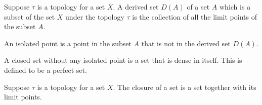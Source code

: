 \begin{definition}
	\label{definition-perfect}
	Suppose $\tau$ is a topology for a set $X$.
	A derived set $D(A)$ of a set $A$ which is a subset of the set $X$ under the topology $\tau$ is the collection of all the limit points of the subset $A$.

	An isolated point is a point in the subset $A$ that is not in the derived set $D(A)$.

	A closed set without any isolated point is a set that is dense in itself. This is defined to be a perfect set.
\end{definition}

\begin{definition}
	\label{definition-closure}
	Suppose $\tau$ is a topology for a set $X$.
	The closure of a set is a set together with its limit points.
\end{definition}
